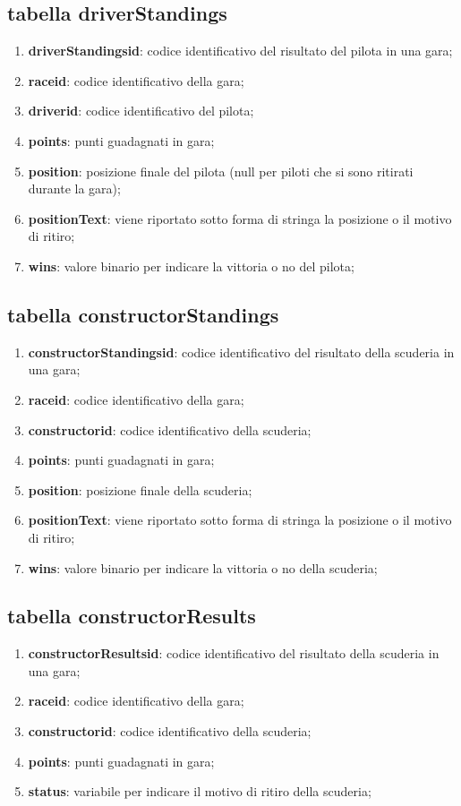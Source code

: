 \subsection{tabella driverStandings}%
\begin{enumerate}
    \item \textbf{driverStandingsid}: codice identificativo del risultato del pilota in una gara;
    \item \textbf{raceid}: codice identificativo della gara;
    \item \textbf{driverid}: codice identificativo del pilota;
    \item \textbf{points}: punti guadagnati in gara;
   \item \textbf{position}: posizione finale del pilota (null per piloti che si sono ritirati durante la gara);
    \item \textbf{positionText}: viene riportato sotto forma di stringa la posizione o il motivo di ritiro;
    \item \textbf{wins}: valore binario per indicare la vittoria o no del pilota;
\end{enumerate}
\subsection{tabella constructorStandings}%
\begin{enumerate}
    \item \textbf{constructorStandingsid}: codice identificativo del risultato della scuderia in una gara;
    \item \textbf{raceid}: codice identificativo della gara;
    \item \textbf{constructorid}: codice identificativo della scuderia;
    \item \textbf{points}: punti guadagnati in gara;
   \item \textbf{position}: posizione finale della scuderia;
    \item \textbf{positionText}: viene riportato sotto forma di stringa la posizione o il motivo di ritiro;
    \item \textbf{wins}: valore binario per indicare la vittoria o no della scuderia;
\end{enumerate}
\subsection{tabella constructorResults}%
\begin{enumerate}
    \item \textbf{constructorResultsid}: codice identificativo del risultato della scuderia in una gara;
    \item \textbf{raceid}: codice identificativo della gara;
    \item \textbf{constructorid}: codice identificativo della scuderia;
    \item \textbf{points}: punti guadagnati in gara;
    \item \textbf{status}: variabile per indicare il motivo di ritiro della scuderia;
\end{enumerate}
